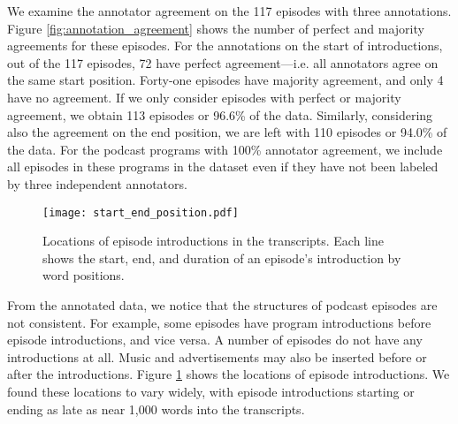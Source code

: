 We examine the annotator agreement on the 117 episodes with three annotations. Figure \ref{fig:annotation_agreement} shows the number of perfect and majority agreements for these episodes. For the annotations on the start of introductions, out of the 117 episodes, 72 have perfect agreement---i.e. all annotators agree on the same start position. Forty-one episodes have majority agreement, and only 4 have no agreement. If we only consider episodes with perfect or majority agreement, we obtain 113 episodes or 96.6\% of the data. Similarly, considering also the agreement on the end position, we are left with 110 episodes or 94.0\% of the data. For the podcast programs with 100\% annotator agreement, we include all episodes in these programs in the dataset even if they have not been labeled by three independent annotators.




\begin{figure}[ht!]
  \centering
  \vspace{-0.4cm}
    \texttt{[image: start\_end\_position.pdf]}
    \vspace{-1cm}
      \caption{Locations of episode introductions in the transcripts. Each line shows the start, end, and duration of an episode's introduction by word positions.}
    \label{fig:start_end_position}
\end{figure}


From the annotated data, we notice that the structures of podcast episodes are not consistent. For example, some episodes have program introductions before episode introductions, and vice versa. A number of episodes do not have any introductions at all. Music and advertisements may also be inserted before or after the introductions. Figure \ref{fig:start_end_position} shows the locations of episode introductions. We found these locations to vary widely, with episode introductions starting or ending as late as near 1,000 words into the transcripts.

